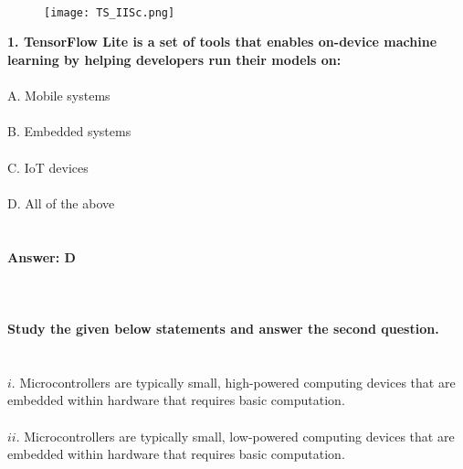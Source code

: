 \documentclass[prl,twocolumn,showpacs,preprintnumbers,superscriptaddress]{revtex4}
\theoremstyle{plain}
\theoremstyle{definition}
\begin{document}
\begin{widetext}
\\
\\
\\

\begin{wrapfigure}
\centering
\end{wrapfigure}
\begin{figure}[h!]
 \begin{right}
  \hfill\texttt{[image: TS\_IISc.png]}
 \end{right}
\end{figure}
\textbf{1. TensorFlow Lite is a set of tools that enables on-device machine learning by helping developers run their models on:}
\\
\\
A. Mobile systems
\\
\\
B. Embedded systems
\\
\\
C. IoT devices
\\
\\
D. All of the above
\\
\\
\\
\textbf{Answer: D}
\\
\\
\\
\\
\textbf{Study the given below statements and answer the second question.}
\\
\\
\\
$i$. Microcontrollers are typically small, high-powered computing devices that are embedded within hardware that requires basic computation.
\\
\\
$ii$. Microcontrollers are typically small, low-powered computing devices that are embedded within hardware that requires basic computation.

\end{widetext}
\end{document}
